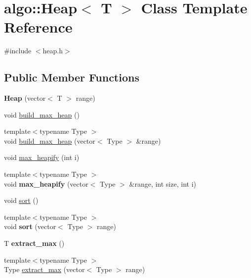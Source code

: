 \hypertarget{classalgo_1_1_heap}{}\section{algo\+:\+:Heap$<$ T $>$ Class Template Reference}
\label{classalgo_1_1_heap}


{\ttfamily \#include $<$heap.\+h$>$}

\subsection*{Public Member Functions}
\begin{DoxyCompactItemize}
\item 
\mbox{\label{classalgo_1_1_heap_a4fc8581c45b74d306b18cd84986860c7}} 
{\bfseries Heap} (vector$<$ T $>$ range)
\item 
void \hyperlink{classalgo_1_1_heap_a983e27671ef1f049dca2b23de309f519}{build\+\_\+max\+\_\+heap} ()
\item 
{\footnotesize template$<$typename Type $>$ }\\void \hyperlink{classalgo_1_1_heap_a2586e8fefb80f8019a51a47c5b62251f}{build\+\_\+max\+\_\+heap} (vector$<$ Type $>$ \&range)
\item 
void \hyperlink{classalgo_1_1_heap_a352e206b5bcf2ae6890e261eb9f5830f}{max\+\_\+heapify} (int i)
\item 
\mbox{\label{classalgo_1_1_heap_a6abf788242bc0a5caca1e9114fb49650}} 
{\footnotesize template$<$typename Type $>$ }\\void {\bfseries max\+\_\+heapify} (vector$<$ Type $>$ \&range, int size, int i)
\item 
void \hyperlink{classalgo_1_1_heap_ae6b1f6fc4660da54d5729da64a7cca94}{sort} ()
\item 
\mbox{\label{classalgo_1_1_heap_ad7715c021cc33f936f14fce460a1d171}} 
{\footnotesize template$<$typename Type $>$ }\\void {\bfseries sort} (vector$<$ Type $>$ range)
\item 
\mbox{\label{classalgo_1_1_heap_a51f8bbdccc4d20c59b51eb83f5f63735}} 
T {\bfseries extract\+\_\+max} ()
\item 
{\footnotesize template$<$typename Type $>$ }\\Type \hyperlink{classalgo_1_1_heap_a5de49b0b3203e1b3155bb25223be78b0}{extract\+\_\+max} (vector$<$ Type $>$ range)

\end{DoxyCompactItemize}
